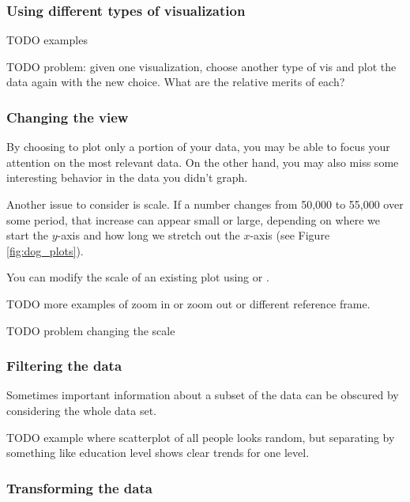 \subsubsection*{Using different types of visualization}

TODO examples

\begin{problem}
TODO problem: given one visualization, choose another type of vis and plot the data again with the new choice.  What are the relative merits of each?
\end{problem}


\subsubsection*{Changing the view}

By choosing to plot only a portion of your data, you may be able to focus your attention on the most relevant data.  On the other hand, you may also miss some interesting behavior in the data you didn't graph.

Another issue to consider is scale. If a number changes from 50,000 to 55,000 over some period, that  increase can appear small or large, depending on where we start the $y$-axis and how long we stretch out the $x$-axis (see Figure \ref{fig:dog_plots}).

You can modify the scale of an existing plot using  or .

TODO more examples of zoom in or zoom out or different reference frame.

\begin{problem}
TODO problem changing the scale 
\end{problem}



\subsubsection*{Filtering the data}

Sometimes important information about a subset of the data can be obscured by considering the whole data set.  

TODO example where scatterplot of all people looks random, but separating by something like education level shows clear trends for one level. 


\subsubsection*{Transforming the data}

